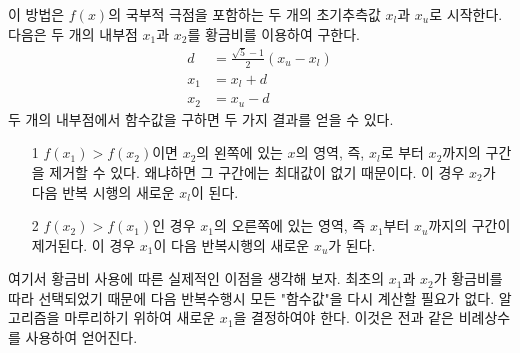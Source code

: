 이 방법은 $f(x)$의 국부적 극점을 포함하는 두 개의 초기추측값 $x_{l}$과 $x_{u}$로 시작한다. 다음은 두 개의 내부점 $x_{1}$과 $x_{2}$를 황금비를 이용하여 구한다.
\begin{align*}
d&=\frac{\sqrt{5}-1}{2}\left(x_{u}-x_{l}\right)\\
x_{1}&=x_{l}+d\\
x_{2}&=x_{u}-d
\end{align*}
두 개의 내부점에서 함수값을 구하면 두 가지 결과를 얻을 수 있다.
\begin{itemize}
\item[1] $f(x_{1})>f(x_{2})$이면 $x_{2}$의 왼쪽에 있는 $x$의 영역, 즉, $x_{l}$로 부터 $x_{2}$까지의 구간을 제거할 수 있다. 왜냐하면 그 구간에는 최대값이 없기 때문이다. 이 경우 $x_{2}$가 다음 반복 시행의 새로운 $x_{l}$이 된다.
\item[2] $f(x_{2})>f(x_{1})$인 경우 $x_{1}$의 오른쪽에 있는 영역, 즉 $x_{1}$부터 $x_{u}$까지의 구간이 제거된다. 이 경우 $x_{1}$이 다음 반복시행의 새로운 $x_{u}$가 된다.
\end{itemize}
여기서 황금비 사용에 따른 실제적인 이점을 생각해 보자. 최초의 $x_{1}$과 $x_{2}$가 황금비를 따라 선택되었기 때문에 다음 반복수행시 모든 "함수값"을 다시 계산할 필요가 없다.
알고리즘을 마루리하기 위하여 새로운 $x_{1}$을 결정하여야 한다. 이것은 전과 같은 비례상수를 사용하여 얻어진다.
